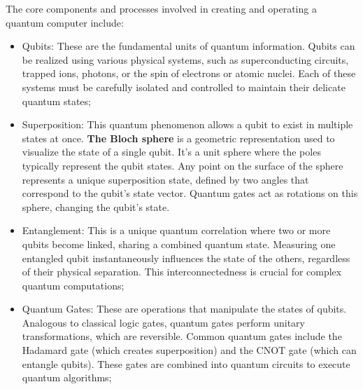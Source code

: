 \documentclass{article}
\begin{document}
The core components and processes involved in creating and operating a quantum computer include:
\begin{itemize}
  \item Qubits: These are the fundamental units of quantum information. Qubits can be realized using various physical systems, such as superconducting circuits, trapped ions, photons, or the spin of electrons or atomic nuclei. Each of these systems must be carefully isolated and controlled to maintain their delicate quantum states;
  
  \item Superposition: This quantum phenomenon allows a qubit to exist in multiple states at once.
  \textbf{The Bloch sphere} is a geometric representation used to visualize the state of a single qubit. It's a unit sphere where the poles typically represent the qubit states. Any point on the surface of the sphere represents a unique superposition state, defined by two angles that correspond to the qubit's state vector. Quantum gates act as rotations on this sphere, changing the qubit's state.
  
  \item Entanglement: This is a unique quantum correlation where two or more qubits become linked, sharing a combined quantum state. Measuring one entangled qubit instantaneously influences the state of the others, regardless of their physical separation. This interconnectedness is crucial for complex quantum computations;
  
  \item Quantum Gates: These are operations that manipulate the states of qubits. Analogous to classical logic gates, quantum gates perform unitary transformations, which are reversible. Common quantum gates include the Hadamard gate (which creates superposition) and the CNOT gate (which can entangle qubits). These gates are combined into quantum circuits to execute quantum algorithms;
\end{itemize}
 
\end{document}
